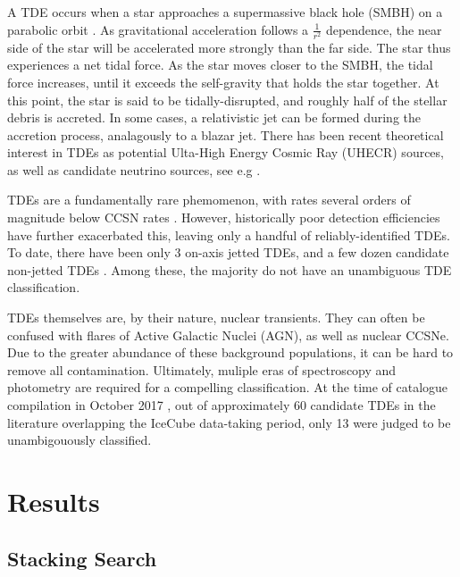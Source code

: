 \documentclass{PoS}
\begin{document}
A TDE occurs when a star approaches a supermassive black hole (SMBH) on a parabolic orbit \cite{Komossa:2015qya}. As gravitational acceleration follows a $\frac{1}{r^{2}}$ dependence, the near side of the star will be accelerated more strongly than the far side. The star thus experiences a net tidal force. As the star moves closer to the SMBH, the tidal force increases, until it exceeds the self-gravity that holds the star together. At this point, the star is said to be tidally-disrupted, and roughly half of the stellar debris is accreted. In some cases, a relativistic jet can be formed during the accretion process, analagously to a blazar jet. There has been recent theoretical interest in TDEs as potential Ulta-High Energy Cosmic Ray (UHECR) sources, as well as candidate neutrino sources, see e.g \cite{Biehl:2017hnb}.

TDEs are a fundamentally rare phemomenon, with rates several orders of magnitude below CCSN rates \cite{vanVelzen:2017qum}. However, historically poor detection efficiencies have further exacerbated this, leaving only a handful of reliably-identified TDEs. To date, there have been only 3 on-axis jetted TDEs, and a few dozen candidate non-jetted TDEs \cite{Komossa:2015qya, Auchettl:2016qfa}. Among these, the majority do not have an unambiguous TDE classification. 

TDEs themselves are, by their nature, nuclear transients. They can often be confused with flares of Active Galactic Nuclei (AGN), as well as nuclear CCSNe. Due to the greater abundance of these background populations, it can be hard to remove all contamination. Ultimately, muliple eras of spectroscopy and photometry are required for a compelling classification. At the time of catalogue compilation in October 2017 \cite{Auchettl:2016qfa}, out of approximately 60 candidate TDEs in the literature overlapping the IceCube data-taking period, only 13 were judged to be unambigouously classified. 

\section{Results}
\subsection{Stacking Search}
\end{document}
